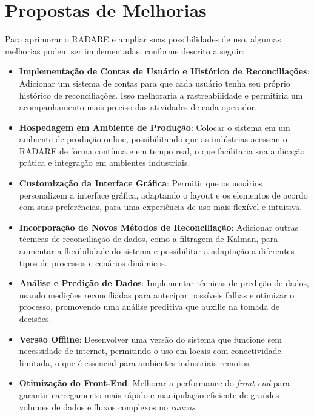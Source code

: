 \section{Propostas de Melhorias}

Para aprimorar o RADARE e ampliar suas possibilidades de uso, algumas melhorias podem ser implementadas, conforme descrito a seguir:

\begin{itemize}
    \item \textbf{Implementação de Contas de Usuário e Histórico de Reconciliações}: Adicionar um sistema de contas para que cada usuário tenha seu próprio histórico de reconciliações. Isso melhoraria a rastreabilidade e permitiria um acompanhamento mais preciso das atividades de cada operador.

    \item \textbf{Hospedagem em Ambiente de Produção}: Colocar o sistema em um ambiente de produção online, possibilitando que as indústrias acessem o RADARE de forma contínua e em tempo real, o que facilitaria sua aplicação prática e integração em ambientes industriais.

    \item \textbf{Customização da Interface Gráfica}: Permitir que os usuários personalizem a interface gráfica, adaptando o layout e os elementos de acordo com suas preferências, para uma experiência de uso mais flexível e intuitiva.

    \item \textbf{Incorporação de Novos Métodos de Reconciliação}: Adicionar outras técnicas de reconciliação de dados, como a filtragem de Kalman, para aumentar a flexibilidade do sistema e possibilitar a adaptação a diferentes tipos de processos e cenários dinâmicos.

    \item \textbf{Análise e Predição de Dados}: Implementar técnicas de predição de dados, usando medições reconciliadas para antecipar possíveis falhas e otimizar o processo, promovendo uma análise preditiva que auxilie na tomada de decisões.

    \item \textbf{Versão Offline}: Desenvolver uma versão do sistema que funcione sem necessidade de internet, permitindo o uso em locais com conectividade limitada, o que é essencial para ambientes industriais remotos.

    \item \textbf{Otimização do Front-End}: Melhorar a performance do \textit{front-end} para garantir carregamento mais rápido e manipulação eficiente de grandes volumes de dados e fluxos complexos no \textit{canvas}.
\end{itemize}


